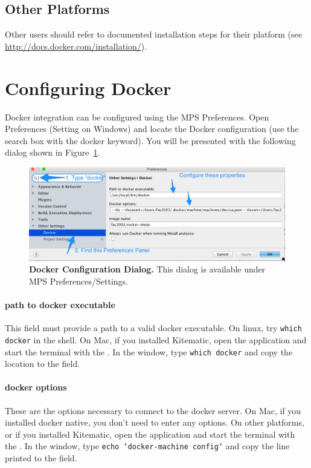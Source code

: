\subsection{Other Platforms}
 Other users should refer to documented installation steps for their platform (see \url{http://docs.docker.com/installation/}).

\section{Configuring Docker}
Docker integration can be configured using the MPS Preferences.  Open Preferences (Setting on Windows) and locate the Docker configuration (use the search box with the docker keyword). You will be presented with the following dialog shown in Figure~\ref{fig:DockerPreferencesDialog}.

\begin{figure}[h!tbp]
  \centering
  \includegraphics[width=\figWidthWide]{figures/DockerPreferencesDialog.png}
\caption[Docker Configuration Dialog.]{\textbf{Docker Configuration Dialog.} This dialog is available under MPS Preferences/Settings.}
\label{fig:DockerPreferencesDialog}
\end{figure}

\paragraph{path to docker executable}
This field must provide a path to a valid docker executable. On linux, try \texttt{which docker} in the shell. On Mac, if you installed Kitematic, open the application and start the terminal with the \allowbreak{}. In the window, type \texttt{which docker} and copy the location to the field. 

\paragraph{docker options}
These are the options necessary to connect to the docker server. On Mac, if you installed  docker native, you don't need to enter any options.  On other platforms, or if you installed Kitematic, open the application and start the terminal with the \allowbreak{}. In the window, type \texttt{echo `docker-machine config`} and copy the line printed to the field. 


